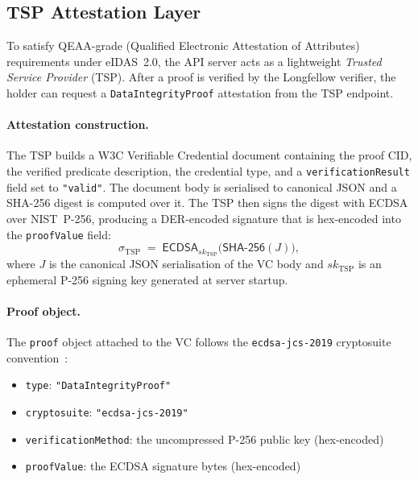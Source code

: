 \subsection{TSP Attestation Layer}\label{sec:impl-tsp}

To satisfy QEAA-grade (Qualified Electronic Attestation of Attributes) requirements under
eIDAS~2.0, the API server acts as a lightweight \emph{Trusted Service Provider} (TSP).
After a proof is verified by the Longfellow verifier, the holder can request a
\texttt{DataIntegrityProof} attestation from the TSP endpoint.

\paragraph{Attestation construction.}
The TSP builds a W3C Verifiable Credential document containing the proof CID, the verified
predicate description, the credential type, and a \texttt{verificationResult} field set to
\texttt{"valid"}.
The document body is serialised to canonical JSON and a SHA-256 digest is computed over it.
The TSP then signs the digest with ECDSA over NIST~P-256, producing a DER-encoded signature
that is hex-encoded into the \texttt{proofValue} field:
\begin{equation*}
  \sigma_{\mathrm{TSP}} \;=\; \mathsf{ECDSA}_{\mathit{sk}_{\mathrm{TSP}}}\!\bigl(\mathsf{SHA\text{-}256}(J)\bigr),
\end{equation*}
where $J$ is the canonical JSON serialisation of the VC body and $\mathit{sk}_{\mathrm{TSP}}$
is an ephemeral P-256 signing key generated at server startup.

\paragraph{Proof object.}
The \texttt{proof} object attached to the VC follows the \texttt{ecdsa-jcs-2019} cryptosuite
convention~\cite{w3c-di}:
\begin{itemize}
  \item \texttt{type}: \texttt{"DataIntegrityProof"}
  \item \texttt{cryptosuite}: \texttt{"ecdsa-jcs-2019"}
  \item \texttt{verificationMethod}: the uncompressed P-256 public key (hex-encoded)
  \item \texttt{proofValue}: the ECDSA signature bytes (hex-encoded)
\end{itemize}

